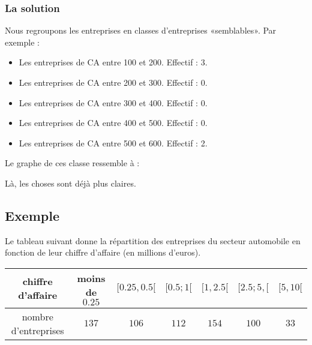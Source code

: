 \subsubsection{La solution}

Nous regroupons les entreprises en classes d'entreprises «semblables». Par exemple :
\begin{itemize}
    \item Les entreprises de CA entre 100 et 200. Effectif : 3.
    \item Les entreprises de CA entre 200 et 300. Effectif : 0.
    \item Les entreprises de CA entre 300 et 400. Effectif : 0.
    \item Les entreprises de CA entre 400 et 500. Effectif : 0.
    \item Les entreprises de CA entre 500 et 600. Effectif : 2.
\end{itemize}

Le graphe de ces classe ressemble à :
\begin{center}
   
\end{center}
Là, les choses sont déjà plus claires.

\subsection{Exemple}

Le tableau suivant donne la répartition des entreprises du secteur automobile en fonction de leur chiffre d'affaire (en millions d'euros).

\begin{center}
    \begin{tabular}{|c||c|c|c|c|c|c|}
        \hline
        chiffre d'affaire&moins de \( 0.25\)&\( \mathopen[ 0.25 ,0.5 [\)&$\mathopen[ 0.5;1  [$&$\mathopen[ 1 , 2.5 [$&$\mathopen[ 2.5;5 ,  [$&$\mathopen[ 5 , 10 [$\\
            \hline\hline
            nombre d'entreprises&\( 137\)&\( 106\)&\( 112\)&$154$&\( 100\)&\( 33\)\\
            \hline
    \end{tabular}
\end{center}

